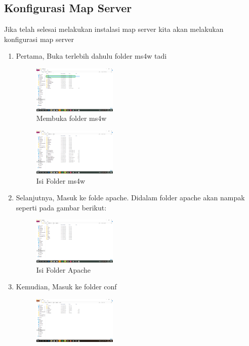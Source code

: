 \subsection{Konfigurasi Map Server}
Jika telah selesai melakukan instalasi map server kita akan melakukan konfigurasi map server
\begin{enumerate}
  \item Pertama, Buka terlebih dahulu folder ms4w tadi
  \hfill\break
    \begin{figure}[H]
		\includegraphics[width=4cm]{figures/tugas4/1174054/9.png}
		\centering
		\caption{Membuka folder ms4w}
    \end{figure}
    \hfill\break
    \begin{figure}[H]
		\includegraphics[width=4cm]{figures/tugas4/1174054/10.png}
		\centering
		\caption{Isi Folder ms4w}
    \end{figure}
  \item Selanjutnya, Masuk ke folde apache. Didalam folder apache akan nampak seperti pada gambar berikut:
  \hfill\break
    \begin{figure}[H]
		\includegraphics[width=4cm]{figures/tugas4/1174054/11.png}
		\centering
		\caption{Isi Folder Apache}
    \end{figure}
  \item Kemudian, Masuk ke folder conf
  \hfill\break
    \begin{figure}[H]
		\includegraphics[width=4cm]{figures/tugas4/1174054/12.png}

\end{figure}
\end{enumerate}
